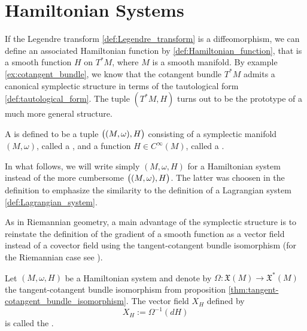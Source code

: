 \section*{Hamiltonian Systems}
If the Legendre transform \ref{def:Legendre_transform} is a diffeomorphism, we can define an associated Hamiltonian function by \ref{def:Hamiltonian_function}, that is a smooth function $H$ on $T^*M$, where $M$ is a smooth manifold. By example \ref{ex:cotangent_bundle}, we know that the cotangent bundle $T^*M$ admits a canonical symplectic structure in terms of the tautological form \ref{def:tautological_form}. The tuple $(T^*M,H)$ turns out to be the prototype of a much more general structure.

\begin{definition}
	A  is defined to be a tuple $\del[1]{(M,\omega),H}$ consisting of a symplectic manifold $(M,\omega)$, called a , and a function $H \in C^\infty(M)$, called a .
\end{definition}

\begin{remark}
	In what follows, we will write simply $(M,\omega,H)$ for a Hamiltonian system instead of the more cumbersome $\del[1]{(M,\omega),H}$. The latter was choosen in the definition to emphasize the similarity to the definition of a Lagrangian system \ref{def:Lagrangian_system}.
\end{remark}

As in Riemannian geometry, a main advantage of the symplectic structure is to reinstate the definition of the gradient of a smooth function as a vector field instead of a covector field using the tangent-cotangent bundle isomorphism (for the Riemannian case see \cite[342--343]{lee:smooth_manifolds:2013}).

\begin{definition}
	Let $(M,\omega,H)$ be a Hamiltonian system and denote by $\Omega : \mathfrak{X}(M) \to \mathfrak{X}^*(M)$ the tangent-cotangent bundle isomorphism from proposition \textup{\ref{thm:tangent-cotangent_bundle_isomorphism}}. The vector field $X_H$ defined by
	\begin{equation}
		\label{eq:Hamiltonian_vector_field}
		X_H := \Omega^{-1}(dH)
	\end{equation}
	\noindent is called the .
\end{definition}

